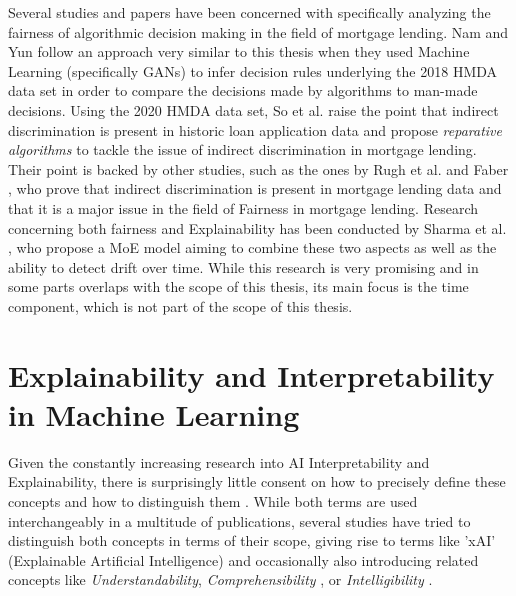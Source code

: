 Several studies and papers have been concerned with specifically analyzing the fairness of algorithmic decision making in the field of mortgage lending.
Nam and Yun \parencite{Nam2022} follow an approach very similar to this thesis when they used Machine Learning (specifically GANs) to infer decision rules underlying the 2018 HMDA data set in order to compare the decisions made by algorithms to man-made decisions.
Using the 2020 HMDA data set, So et al. \parencite{So2022} raise the point that indirect discrimination is present in historic loan application data and propose \textit{reparative algorithms} to tackle the issue of indirect discrimination in mortgage lending.
Their point is backed by other studies, such as the ones by Rugh et al. \parencite{Rugh2015} and Faber \parencite{Faber2013}, who prove that indirect discrimination is present in mortgage lending data and that it is a major issue in the field of Fairness in mortgage lending.
Research concerning both fairness and Explainability has been conducted by Sharma et al. \parencite{Sharma2022}, who propose a MoE model aiming to combine these two aspects as well as the ability to detect drift over time.
While this research is very promising and in some parts overlaps with the scope of this thesis, its main focus is the time component, which is not part of the scope of this thesis.

\section{Explainability and Interpretability in Machine Learning}\label{sec:Explainability}

Given the constantly increasing research into AI Interpretability and Explainability, there is surprisingly little consent on how to precisely define these concepts and how to distinguish them \parencite{Linardatos2021}. 
While both terms are used interchangeably in a multitude of publications, several studies have tried to distinguish both concepts in terms of their scope, giving rise to terms like 'xAI' (Explainable Artificial Intelligence) \parencite{Gunning2019} and occasionally also introducing related concepts like \textit{Understandability}, \textit{Comprehensibility} \parencite{Guidotti2018}, or \textit{Intelligibility} \parencite{Caruana2015}.

